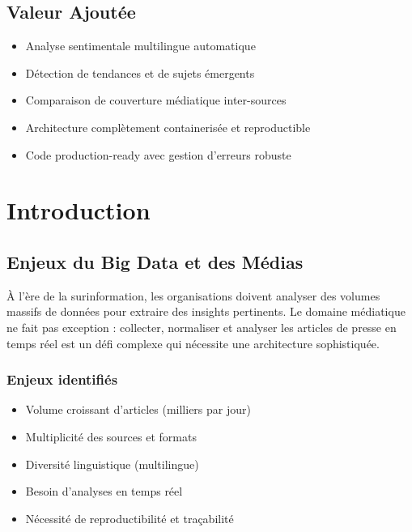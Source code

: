 \documentclass[12pt,a4paper]{report}
\begin{document}
\section*{Valeur Ajoutée}

\begin{itemize}
    \item Analyse sentimentale multilingue automatique
    \item Détection de tendances et de sujets émergents
    \item Comparaison de couverture médiatique inter-sources
    \item Architecture complètement containerisée et reproductible
    \item Code production-ready avec gestion d'erreurs robuste
\end{itemize}


\chapter{Introduction}

\section{Enjeux du Big Data et des Médias}

À l'ère de la surinformation, les organisations doivent analyser des volumes massifs de données pour extraire des insights pertinents. Le domaine médiatique ne fait pas exception : collecter, normaliser et analyser les articles de presse en temps réel est un défi complexe qui nécessite une architecture sophistiquée.

\subsection{Enjeux identifiés}

\begin{itemize}
    \item Volume croissant d'articles (milliers par jour)
    \item Multiplicité des sources et formats
    \item Diversité linguistique (multilingue)
    \item Besoin d'analyses en temps réel
    \item Nécessité de reproductibilité et traçabilité
\end{itemize}
\end{document}

